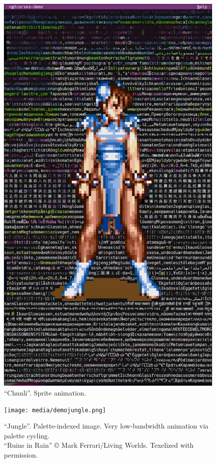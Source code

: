 \documentclass[letterpaper,10pt]{article}
\begin{document}
\begin{figure}
  \centering \includegraphics[width=.75\linewidth]{media/demo-chunli2.png}
  \caption{``Chunli''. Sprite animation.}
\end{figure}

\begin{figure}
  \centering \texttt{[image: media/demojungle.png]}
  \caption[``Jungle''. Palette-indexed image.]{``Jungle''. Palette-indexed image. Very low-bandwidth animation via palette cycling.\\
    ``Ruins in Rain'' © Mark Ferrari/Living Worlds. Texelized with permission.}
\end{figure}


\newpage
\end{document}
